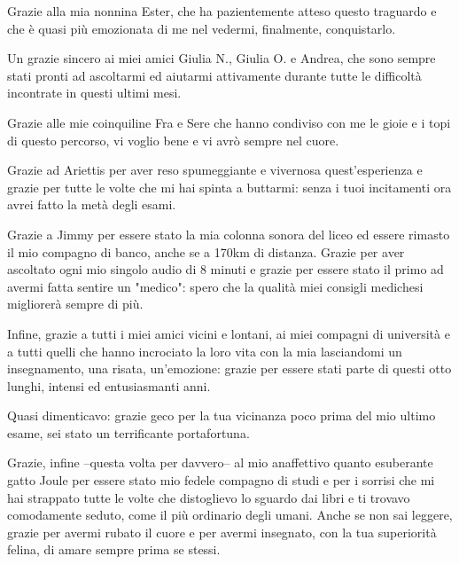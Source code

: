 \bigskip \noindent
Grazie alla mia nonnina Ester, che ha pazientemente atteso questo traguardo e che è quasi più emozionata di me nel vedermi, finalmente, conquistarlo.

\bigskip \noindent
Un grazie sincero ai miei amici Giulia N., Giulia O. e Andrea, che sono sempre stati pronti ad ascoltarmi ed aiutarmi attivamente durante tutte le difficoltà incontrate in questi ultimi mesi. 

\bigskip \noindent
Grazie alle mie coinquiline Fra e Sere che hanno condiviso con me le gioie e i topi di questo percorso, vi voglio bene e vi avrò sempre nel cuore. 

\bigskip \noindent
Grazie ad Ariettis per aver reso spumeggiante e vivernosa quest'esperienza e grazie per tutte le volte che mi hai spinta a buttarmi: senza i tuoi incitamenti ora avrei fatto la metà degli esami.

\bigskip \noindent
Grazie a Jimmy per essere stato la mia colonna sonora del liceo ed essere rimasto il mio compagno di banco, anche se a 170km di distanza. Grazie per aver ascoltato ogni mio singolo audio di 8 minuti e grazie per essere stato il primo ad avermi fatta sentire un "medico": spero che la qualità miei consigli medichesi migliorerà sempre di più. 

\bigskip\noindent
Infine, grazie a tutti i miei amici vicini e lontani, ai miei compagni di università e a tutti quelli che hanno incrociato la loro vita con la mia lasciandomi un insegnamento, una risata, un'emozione: grazie per essere stati parte di questi otto lunghi, intensi ed entusiasmanti anni.

\bigskip\noindent
Quasi dimenticavo: grazie geco per la tua vicinanza poco prima del mio ultimo esame, sei stato un terrificante portafortuna. 

\bigskip\noindent
Grazie, infine --questa volta per davvero-- al mio anaffettivo quanto esuberante gatto Joule per essere stato mio fedele compagno di studi e per i sorrisi che mi hai strappato tutte le volte che distoglievo lo sguardo dai libri e ti trovavo comodamente seduto, come il più ordinario degli umani. Anche se non sai leggere, grazie per avermi rubato il cuore e per avermi insegnato, con la tua superiorità felina, di amare sempre prima se stessi.  